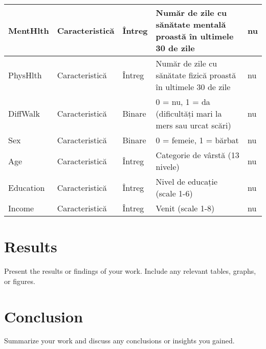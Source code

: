 \documentclass{article}
\begin{document}
\begin{longtable}{|p{4cm}|p{2cm}|p{2cm}|p{6cm}|p{3cm}|}
\hline
MentHlth & Caracteristică & Întreg &  Număr de zile cu sănătate mentală proastă în ultimele 30 de zile & nu \\
\hline
PhysHlth & Caracteristică & Întreg &  Număr de zile cu sănătate fizică proastă în ultimele 30 de zile & nu \\
\hline
DiffWalk & Caracteristică & Binare &  0 = nu, 1 = da (dificultăți mari la mers sau urcat scări) & nu \\
\hline
Sex & Caracteristică & Binare &  0 = femeie, 1 = bărbat & nu \\
\hline
Age & Caracteristică & Întreg &  Categorie de vârstă (13 nivele) & nu \\
\hline
Education & Caracteristică & Întreg &  Nivel de educație (scale 1-6) & nu \\
\hline
Income & Caracteristică & Întreg &  Venit (scale 1-8) & nu \\
\hline
\end{longtable}

\section{Results}
Present the results or findings of your work. Include any relevant tables, graphs, or figures.

\section{Conclusion}
Summarize your work and discuss any conclusions or insights you gained.
\end{document}
